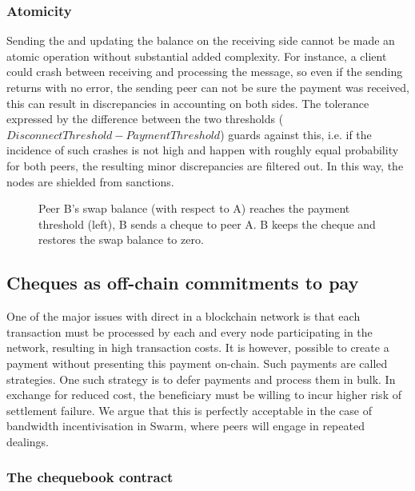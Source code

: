 \subsubsection{Atomicity}

Sending the  and updating the balance on the receiving side cannot be made an atomic operation without substantial added complexity. For instance, a client could crash between receiving and processing the message, so even if the sending returns with no error, the sending peer can not be sure the payment was received, this can result in discrepancies in accounting on both sides. The tolerance expressed by the difference between the two thresholds ($\mathit{DisconnectThreshold}-\mathit{PaymentThreshold}$) guards against this, i.e. if the incidence of such crashes is not high and happen with roughly equal probability for both peers, the resulting minor discrepancies are filtered out. In this way, the nodes are shielded from sanctions.

\begin{center}
\begin{figure}[htbp]

\caption[Cheque swap \statusgreen]{Peer B's swap balance (with respect to A) reaches the payment threshold (left),
B sends a cheque to peer A. B keeps the cheque and restores the swap balance to zero.}
\label{fig:chequeswap}
\end{figure}
\end{center}

\subsection{Cheques as off-chain commitments to pay\statusgreen}\label{sec:cheques}

One of the major issues with direct  in a blockchain network is that each transaction must be processed by each and every node participating in the network, resulting in high transaction costs. It is however, possible to create a payment without presenting this payment on-chain. Such payments are called  strategies. One such strategy is to defer payments and process them in bulk. In exchange for reduced cost, the beneficiary must be willing to incur higher risk of settlement failure. We argue that this is perfectly acceptable in the case of bandwidth incentivisation in Swarm, where peers will engage in repeated dealings.


\subsubsection{The chequebook contract}

